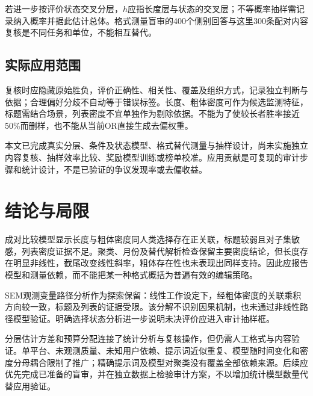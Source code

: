 \documentclass[UTF8,11pt,a4paper,fontset=windows]{ctexart}
\numberwithin{equation}{section}
\begin{document}
若进一步按评价状态交叉分层，$h$应指长度层与状态的交叉层；不等概率抽样需记录纳入概率并据此估计总体。格式测量盲审的400个侧别回答与这里300条配对内容复核是不同任务和单位，不能相互替代。

\subsection{实际应用范围}
复核时应隐藏原始胜负，评价正确性、相关性、覆盖及组织方式，记录独立判断与依据；合理偏好分歧不自动等于错误标签。长度、粗体密度可作为候选监测特征，标题需结合场景，列表密度不宜单独作为剔除依据。不能为了使较长者胜率接近50\%而删样，也不能从当前OR直接生成去偏权重。

本文已完成真实分层、条件及状态模型、格式替代测量与抽样设计，尚未实施独立内容复核、抽样效率比较、奖励模型训练或榜单校准。应用贡献是可复现的审计步骤和统计设计，不是已验证的争议发现率或去偏收益。

\section{结论与局限}
成对比较模型显示长度与粗体密度同人类选择存在正关联，标题较弱且对子集敏感，列表密度证据不足。聚类、月份及替代解析检查保留主要密度结论，但长度存在明显非线性，截尾改变线性斜率，粗体存在性也未表现出同样支持。因此应报告模型和测量依赖，而不能把某一种格式概括为普遍有效的编辑策略。

SEM观测变量路径分析作为探索保留：线性工作设定下，经粗体密度的关联乘积方向较一致，标题及列表的证据受限。该分解不识别因果机制，也未通过非线性路径模型验证。明确选择状态分析进一步说明未决评价应进入审计抽样框。

分层估计方差和预算分配连接了统计分析与复核操作，但仍需人工格式与内容验证。单平台、未观测质量、未知用户依赖、提示词近似重复、模型随时间变化和密度分母耦合限制了推广；精确提示词及模型对聚类没有覆盖全部依赖来源。后续应优先完成已准备的盲审，并在独立数据上检验审计方案，不以增加统计模型数量代替应用验证。
\end{document}
